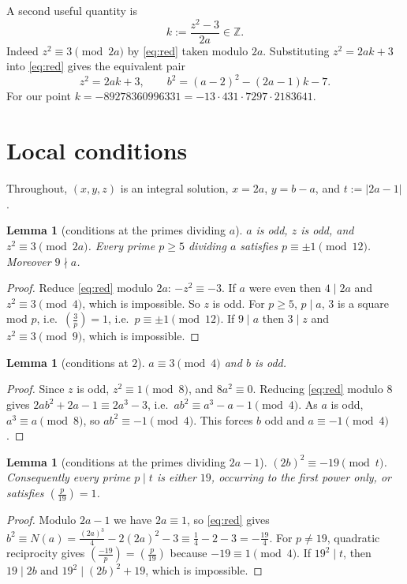 \documentclass[11pt]{article}
\newtheorem{lemma}[theorem]{Lemma}
\theoremstyle{remark}
\theoremstyle{definition}
\newcommand{\Z}{\mathbb{Z}}
\newcommand{\leg}[2]{\left(\frac{#1}{#2}\right)}
\begin{document}
A second useful quantity is
\begin{equation}\label{eq:k}
k:=\frac{z^2-3}{2a}\in\Z .
\end{equation}
Indeed $z^2\equiv 3\pmod{2a}$ by \eqref{eq:red} taken modulo $2a$.  Substituting
$z^2=2ak+3$ into \eqref{eq:red} gives the equivalent pair
\begin{equation}\label{eq:pair}
z^2=2ak+3,\qquad b^2=(a-2)^2-(2a-1)k-7 .
\end{equation}
For our point $k=-89278360996331=-13\cdot 431\cdot 7297\cdot 2183641$.

\section{Local conditions}\label{sec:local}

Throughout, $(x,y,z)$ is an integral solution, $x=2a$, $y=b-a$, and $t:=|2a-1|$.

\begin{lemma}[conditions at the primes dividing $a$]\label{lem:a}
$a$ is odd, $z$ is odd, and $z^2\equiv 3\pmod{2a}$.  Every prime $p\ge5$ dividing $a$ satisfies
$p\equiv\pm1\pmod{12}$.  Moreover $9\nmid a$.
\end{lemma}
\begin{proof}
Reduce \eqref{eq:red} modulo $2a$: $-z^2\equiv -3$.  If $a$ were even then $4\mid 2a$ and
$z^2\equiv 3\pmod 4$, which is impossible.  So $z$ is odd.  For $p\ge5$, $p\mid a$, $3$ is a square
mod $p$, i.e.\ $\leg{3}{p}=1$, i.e.\ $p\equiv\pm1\pmod{12}$.  If $9\mid a$ then $3\mid z$ and
$z^2\equiv 3\pmod 9$, which is impossible.
\end{proof}

\begin{lemma}[conditions at $2$]\label{lem:two}
$a\equiv 3\pmod 4$ and $b$ is odd.
\end{lemma}
\begin{proof}
Since $z$ is odd, $z^2\equiv1\pmod 8$, and $8a^2\equiv0$.  Reducing \eqref{eq:red} modulo $8$ gives
$2ab^2+2a-1\equiv 2a^3-3$, i.e.\ $ab^2\equiv a^3-a-1\pmod 4$.  As $a$ is odd, $a^3\equiv a\pmod 8$,
so $ab^2\equiv -1\pmod4$.  This forces $b$ odd and $a\equiv-1\pmod 4$.
\end{proof}

\begin{lemma}[conditions at the primes dividing $2a-1$]\label{lem:t}
$(2b)^2\equiv -19\pmod{t}$.  Consequently every prime $p\mid t$ is either $19$, occurring to the
first power only, or satisfies $\leg{p}{19}=1$.
\end{lemma}
\begin{proof}
Modulo $2a-1$ we have $2a\equiv1$, so \eqref{eq:red} gives
$b^2\equiv N(a)=\tfrac{(2a)^3}{4}-2(2a)^2-3\equiv \tfrac14-2-3=-\tfrac{19}{4}$.  For $p\ne19$,
quadratic reciprocity gives $\leg{-19}{p}=\leg{p}{19}$ because $-19\equiv1\pmod4$.  If $19^2\mid t$,
then $19\mid 2b$ and $19^2\mid(2b)^2+19$, which is impossible.
\end{proof}
\end{document}
